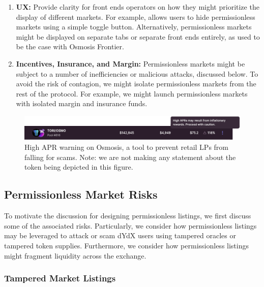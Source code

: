             \begin{enumerate}
                \item \textbf{UX:} Provide clarity for front ends operators on how they might prioritize the display of different markets. For example,  allows users to hide permissionless markets using a simple toggle button. Alternatively, permissionless markets might be displayed on separate tabs or separate front ends entirely, as used to be the case with Osmosis Frontier.
                \item \textbf{Incentives, Insurance, and Margin:} Permissionless markets might be subject to a number of inefficiencies or malicious attacks, discussed below. To avoid the risk of contagion, we might isolate permissionless markets from the rest of the protocol. For example, we might launch permissionless markets with isolated margin and insurance funds.
            \end{enumerate}
    
            \begin{figure}
                \centering
                \includegraphics[width=\linewidth]{figs/frontierwarning.png}
                \captionsetup[]{width=\linewidth}
                \caption{High APR warning on Osmosis, a tool to prevent retail LPs from falling for scams. Note: we are not making any statement about the token being depicted in this figure.}
                \label{fig:frontierwarning}
            \end{figure}


    \subsection{Permissionless Market Risks}

        To motivate the discussion for designing permissionless listings, we first discuss some of the associated risks. Particularly, we consider how permissionless listings may be leveraged to attack or scam dYdX users using tampered oracles or tampered token supplies. Furthermore, we consider how permissionless listings might fragment liquidity across the exchange.

        \subsubsection{Tampered Market Listings}

